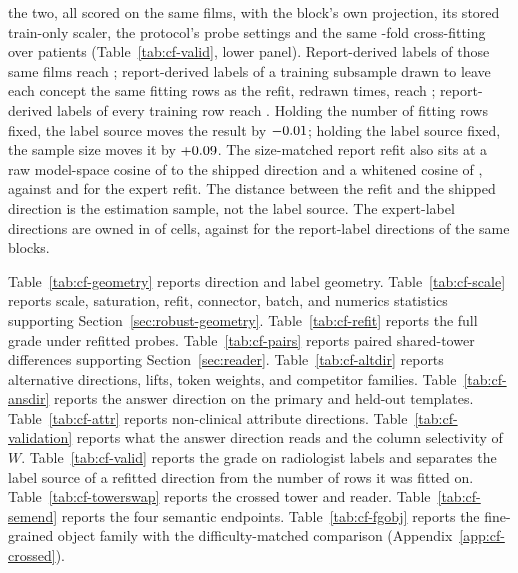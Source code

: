 \documentclass{article}
\begin{document}
the two, all scored on the same films, with the block's own projection, its stored train-only scaler, the protocol's probe settings and the same \cfVfArmFolds{}-fold cross-fitting over patients (Table~\ref{tab:cf-valid}, lower panel). Report-derived labels of those same \cfVfArmRows{} films reach \cfVfArmReportSameFilmsAuroc{}; report-derived labels of a training subsample drawn to leave each concept the same \cfVfArmReportSubRows{} fitting rows as the refit, redrawn \cfVfArmDraws{} times, reach \cfVfArmReportSubAuroc{}; report-derived labels of every training row reach \cfVfArmReportFullAuroc{}. Holding the number of fitting rows fixed, the label source moves the result by $-0.01$; holding the label source fixed, the sample size moves it by $+0.09$. The size-matched report refit also sits at a raw model-space cosine of \cfVfArmReportSubCos{} to the shipped direction and a whitened cosine of \cfVfArmReportSubCosWhite{}, against \cfVfArmExpertCos{} and \cfVfArmExpertCosWhite{} for the expert refit. The distance between the refit and the shipped direction is the estimation sample, not the label source. The expert-label directions are owned in \cfValidfitOwnedExpert{} of \cfValidfitCells{} cells, against \cfValidfitOwnedReport{} for the report-label directions of the same blocks.

Table~\ref{tab:cf-geometry} reports direction and label geometry. Table~\ref{tab:cf-scale} reports scale, saturation, refit, connector, batch, and numerics statistics supporting Section~\ref{sec:robust-geometry}. Table~\ref{tab:cf-refit} reports the full grade under refitted probes. Table~\ref{tab:cf-pairs} reports paired shared-tower differences supporting Section~\ref{sec:reader}. Table~\ref{tab:cf-altdir} reports alternative directions, lifts, token weights, and competitor families. Table~\ref{tab:cf-ansdir} reports the answer direction on the primary and held-out templates. Table~\ref{tab:cf-attr} reports non-clinical attribute directions. Table~\ref{tab:cf-validation} reports what the answer direction reads and the column selectivity of $W$. Table~\ref{tab:cf-valid} reports the grade on radiologist labels and separates the label source of a refitted direction from the number of rows it was fitted on. Table~\ref{tab:cf-towerswap} reports the crossed tower and reader. Table~\ref{tab:cf-semend} reports the four semantic endpoints. Table~\ref{tab:cf-fgobj} reports the fine-grained object family with the difficulty-matched comparison (Appendix~\ref{app:cf-crossed}).
\end{document}
